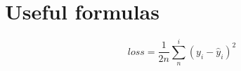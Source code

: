 \documentclass[letterpaper,12pt]{article}
\begin{document}
    \section{Useful formulas}\label{sec:useful-formulas}


    $$loss=\frac{1}{2n}\sum_{n}^{i}(y_{i}-\hat{y}_{i})^{2}$$
\end{document}
